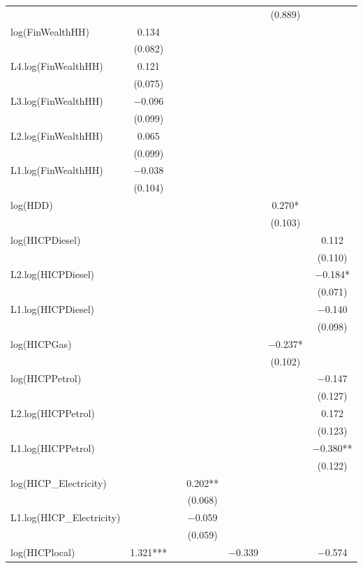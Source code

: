 \begin{table}
{\begin{tabular}[t]{lcccccc}
 &  &  &  &  & (\num{0.889}) & \\
log(FinWealthHH) & \num{0.134} &  &  &  &  & \\
 & (\num{0.082}) &  &  &  &  & \\
L4.log(FinWealthHH) & \num{0.121} &  &  &  &  & \\
 & (\num{0.075}) &  &  &  &  & \\
L3.log(FinWealthHH) & \num{-0.096} &  &  &  &  & \\
 & (\num{0.099}) &  &  &  &  \vphantom{1} & \\
L2.log(FinWealthHH) & \num{0.065} &  &  &  &  & \\
 & (\num{0.099}) &  &  &  &  & \\
L1.log(FinWealthHH) & \num{-0.038} &  &  &  &  & \\
 & (\num{0.104}) &  &  &  &  & \\
log(HDD) &  &  &  &  & \num{0.270}* & \\
 &  &  &  &  & (\num{0.103}) & \\
log(HICPDiesel) &  &  &  &  &  & \num{0.112}\\
 &  &  &  &  &  & (\num{0.110})\\
L2.log(HICPDiesel) &  &  &  &  &  & \num{-0.184}*\\
 &  &  &  &  &  & (\num{0.071})\\
L1.log(HICPDiesel) &  &  &  &  &  & \num{-0.140}\\
 &  &  &  &  &  & (\num{0.098})\\
log(HICPGas) &  &  &  &  & \num{-0.237}* & \\
 &  &  &  &  & (\num{0.102}) & \\
log(HICPPetrol) &  &  &  &  &  & \num{-0.147}\\
 &  &  &  &  &  & (\num{0.127})\\
L2.log(HICPPetrol) &  &  &  &  &  & \num{0.172}\\
 &  &  &  &  &  & (\num{0.123})\\
L1.log(HICPPetrol) &  &  &  &  &  & \num{-0.380}**\\
 &  &  &  &  &  & (\num{0.122})\\
log(HICP\_Electricity) &  &  & \num{0.202}** &  &  & \\
 &  &  & (\num{0.068}) &  &  & \\
L1.log(HICP\_Electricity) &  &  & \num{-0.059} &  &  & \\
 &  &  & (\num{0.059}) &  &  & \\
log(HICPlocal) & \num{1.321}*** &  &  & \num{-0.339} &  & \num{-0.574}\\

\end{tabular}}
\end{table}
